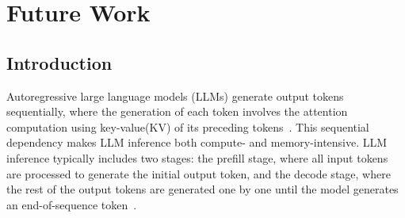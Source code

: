 \chapter{Future Work}
\label{chap:future}

\newcommand{\llm}{LLM\xspace}
\newcommand{\llmfull}{Large Language Model\xspace}
\newcommand{\kv}{KV\xspace}
\newcommand{\kvfull}{key-value\xspace}
\newcommand{\kvcache}{\kv cache\xspace}
\newcommand{\kvcachefull}{\kvfull cache\xspace}
\newcommand{\gptfast}{gpt-fast\xspace}
\newcommand{\cxl}{CXL\xspace}
\newcommand{\cxlfull}{Compute Express Link\xspace}
\newcommand{\api}{API\xspace}
\newcommand{\gpu}{GPU\xspace}
\newcommand{\ssd}{SSD\xspace}
\newcommand{\slo}{SLO\xspace}
\newcommand{\slofull}{service-level objective\xspace}
\newcommand{\roifull}{Return on Investment\xspace}
\newcommand{\roi}{ROI\xspace}
\newcommand{\apisave}{\texttt{save}\xspace}
\newcommand{\apiload}{\texttt{load}\xspace}
\newcommand{\ttft}{TTFT\xspace}
\newcommand{\ttftfull}{time to first token\xspace}
\newcommand{\llama}{LLaMA\xspace}
\newcommand{\asic}{ASIC\xspace}

\newcommand{\tool}{\textit{KVExpress}\xspace}

\newcommand{\sam}[1]{{\color{blue}#1}\xspace}
\newcommand{\ltp}[1]{{\color{magenta}#1}\xspace}
\newcommand{\Space}[1]{\xspace}
\newcommand{\fix}[1]{{\color{red}#1}\xspace}

\newcommand{\para}[1]{\vspace{3pt}\noindent \textbf{#1.}~~}

\section{Introduction}
Autoregressive large language models (\llm{}s) generate output tokens sequentially, where the generation of each token involves the attention computation using \kvfull (\kv) of its preceding tokens~\cite{gpt1, gpt2, gpt3}. 
This sequential dependency makes \llm inference both compute- and memory-intensive.
\llm inference typically includes two stages: the prefill stage, where all input tokens are processed to generate the initial output token, and the decode stage, where the rest of the output tokens are generated one by one until the model generates an end-of-sequence token~\cite{agrawal2023sarathi,distserve,patel2024splitwise}. 


